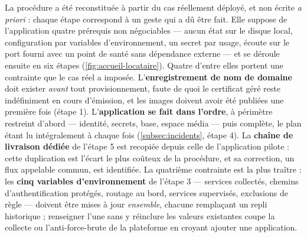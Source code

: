La procédure a été reconstituée à partir du cas réellement déployé, et non écrite \emph{a priori} :
chaque étape correspond à un geste qui a dû être fait. Elle suppose de l'application quatre prérequis
non négociables --- aucun état sur le disque local, configuration par variables d'environnement, un
secret par usage, écoute sur le port fourni avec un point de santé sans dépendance externe --- et se
déroule ensuite en six étapes (\cref{fig:accueil-locataire}). Quatre d'entre elles portent une
contrainte que le cas réel a imposée. L'\textbf{enregistrement de nom de domaine} doit exister
\emph{avant} tout provisionnement, faute de quoi le certificat géré reste indéfiniment en cours
d'émission, et les images doivent avoir été publiées une première fois (étape 1).
L'\textbf{application se fait dans l'ordre}, à périmètre restreint d'abord --- identité, secrets,
base, espace média --- puis complète, le plan étant lu intégralement à chaque fois
(\cref{subsec:incidents}, étape 4). La \textbf{chaîne de livraison dédiée} de l'étape 5 est recopiée
depuis celle de l'application pilote : cette duplication est l'écart le plus coûteux de la procédure,
et sa correction, un flux appelable commun, est identifiée. La quatrième contrainte est la plus
traître : les \textbf{cinq variables d'environnement} de l'étape 3 --- services collectés, chemins
d'authentification protégés, routage au bord, services supervisés, exclusions de règle --- doivent
être mises à jour \emph{ensemble}, chacune remplaçant un repli historique ; renseigner l'une sans y
réinclure les valeurs existantes coupe la collecte ou l'anti-force-brute de la plateforme en croyant
ajouter une application.

